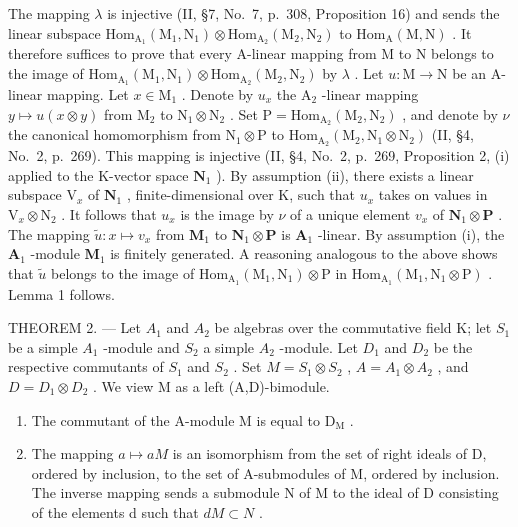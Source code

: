 The mapping \(\lambda\) is injective (II, §7, No.~7, p.~308, Proposition 16) and sends the linear subspace \(\mathrm{Hom}_{\mathrm{A}_1}(\mathrm{M}_1,\mathrm{N}_1)\otimes \mathrm{Hom}_{\mathrm{A}_2}(\mathrm{M}_2,\mathrm{N}_2)\) to \(\mathrm{Hom}_{\mathrm{A}}(\mathrm{M},\mathrm{N})\) . It therefore suffices to prove that every A-linear mapping from M to N belongs to the image of \(\mathrm{Hom}_{\mathrm{A}_1}(\mathrm{M}_1,\mathrm{N}_1)\otimes \mathrm{Hom}_{\mathrm{A}_2}(\mathrm{M}_2,\mathrm{N}_2)\) by \(\lambda\) . Let \(u:\mathrm{M}\to \mathrm{N}\) be an A-linear mapping. Let \(x\in \mathrm{M}_1\) . Denote by \(u_{x}\) the \(\mathrm{A}_2\) -linear mapping \(y\mapsto u(x\otimes y)\) from \(\mathrm{M}_2\) to \(\mathrm{N}_1\otimes \mathrm{N}_2\) . Set \(\mathrm{P} = \mathrm{Hom}_{\mathrm{A}_2}(\mathrm{M}_2,\mathrm{N}_2)\) , and denote by \(\nu\) the canonical homomorphism from \(\mathrm{N}_1\otimes \mathrm{P}\) to \(\mathrm{Hom}_{\mathrm{A}_2}(\mathrm{M}_2,\mathrm{N}_1\otimes \mathrm{N}_2)\) (II, §4, No.~2, p.~269). This mapping is injective (II, §4, No.~2, p.~269, Proposition 2, (i) applied to the K-vector space \(\mathbf{N}_1\) ). By assumption (ii), there exists a linear subspace \(\mathrm{V}_x\) of \(\mathbf{N}_1\) , finite-dimensional over K, such that \(u_{x}\) takes on values in \(\mathrm{V}_x\otimes \mathrm{N}_2\) . It follows that \(u_{x}\) is the image by \(\nu\) of a unique element \(v_{x}\) of \(\mathbf{N}_1\otimes \mathbf{P}\) . The mapping \(\widetilde{u}:x\mapsto v_x\) from \(\mathbf{M}_1\) to \(\mathbf{N}_1\otimes \mathbf{P}\) is \(\mathbf{A}_1\) -linear. By assumption (i), the \(\mathbf{A}_1\) -module \(\mathbf{M}_1\) is finitely generated. A reasoning analogous to the above shows that \(\widetilde{u}\) belongs to the image of \(\mathrm{Hom}_{\mathrm{A}_1}(\mathrm{M}_1,\mathrm{N}_1)\otimes \mathrm{P}\) in \(\mathrm{Hom}_{\mathrm{A}_1}(\mathrm{M}_1,\mathrm{N}_1\otimes \mathrm{P})\) . Lemma 1 follows.

THEOREM 2. --- Let \(A_{1}\) and \(A_{2}\) be algebras over the commutative field K; let \(S_{1}\) be a simple \(A_{1}\) -module and \(S_{2}\) a simple \(A_{2}\) -module. Let \(D_{1}\) and \(D_{2}\) be the respective commutants of \(S_{1}\) and \(S_{2}\) . Set \(M = S_{1} \otimes S_{2}\) , \(A = A_{1} \otimes A_{2}\) , and \(D = D_{1} \otimes D_{2}\) . We view M as a left (A,D)-bimodule.

\begin{enumerate}
\def\labelenumi{\alph{enumi})}
\item
  The commutant of the A-module M is equal to \(\mathrm{D}_{\mathrm{M}}\) .
\item
  The mapping \(a \mapsto aM\) is an isomorphism from the set of right ideals of D, ordered by inclusion, to the set of A-submodules of M, ordered by inclusion. The inverse mapping sends a submodule N of M to the ideal of D consisting of the elements d such that \(dM \subset N\) .
\end{enumerate}

